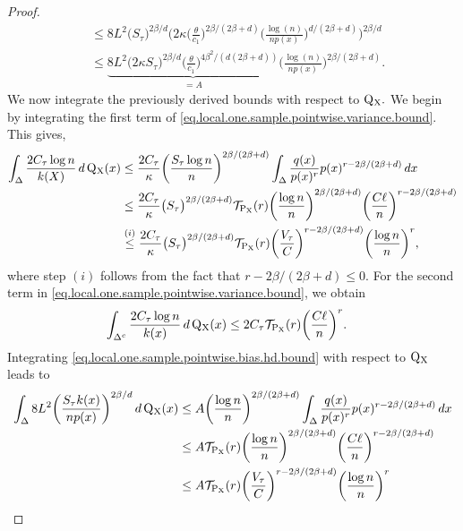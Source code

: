 \documentclass[10pt]{article}
\newcommand{\mT}{\mathcal{T}}
\renewcommand{\P}{\operatorname{P}}
\newcommand{\Q}{\operatorname{Q}}
\renewcommand{\k}{\kappa}
\newcommand{\sX}{\mathrm{X}}
\begin{document}
\begin{proof}
\begin{align}
        &\leq 8L^2\big(S_\tau\big)^{2\beta/d}\Bigg(2\k\bigg(\frac{\theta}{c_1}\bigg)^{2\beta/(2\beta + d)}\bigg(\frac{\log(n)}{np(x)}\bigg)^{d/(2\beta + d)}\Bigg)^{2\beta/d} \nonumber\\
        &\leq \underbrace{8L^2\big(2\k S_\tau\big)^{2\beta/d}\bigg(\frac{\theta}{c_1}\bigg)^{4\beta^2/(d(2\beta + d))}}_{= A}\bigg(\frac{\log(n)}{np(x)}\bigg)^{2\beta/(2\beta + d)}.
    \end{align}
    We now integrate the previously derived bounds with respect to $\Q\mathstrut_{\!\sX}.$ We begin by integrating the first term of \eqref{eq.local.one.sample.pointwise.variance.bound}. This gives,
    \begin{align*}
        \int_{\Delta}\frac{2C_\tau \log n}{k(X)}\, d\Q\mathstrut_{\!\sX}(x) &\leq \frac{2C_\tau}{\kappa}\bigg(\frac{S_\tau\log n}{n}\bigg)^{2\beta/(2\beta + d)}\int_{\Delta}\frac{q(x)}{p(x)^{r}}p(x)^{r - 2\beta/(2\beta + d)}\, dx\\
        &\leq \frac{2C_\tau}{\kappa}\big(S_\tau\big)^{2\beta/(2\beta + d)}\mT_{\P_{\sX}}(r)\bigg(\frac{\log n}{n}\bigg)^{2\beta/(2\beta + d)}\bigg(\frac{C\ell}{n}\bigg)^{r - 2\beta/(2\beta + d)}\\
        &\overset{(i)}{\leq} \frac{2C_\tau}{\kappa}\big(S_\tau\big)^{2\beta/(2\beta + d)}\mT_{\P_{\sX}}(r)\bigg(\frac{V_\tau}{C}\bigg)^{r - 2\beta/(2\beta + d)}\bigg(\frac{\log n}{n}\bigg)^{r},
    \end{align*}
    where step $(i)$ follows from the fact that $r - 2\beta/(2\beta + d) \leq 0.$ For the second term in \eqref{eq.local.one.sample.pointwise.variance.bound}, we obtain
    \begin{align*}
        \int_{\Delta^c}\frac{2C_\tau\log n}{k(x)}\, d\Q\mathstrut_{\!\sX}(x) &\leq 2C_\tau\mT_{\P_{\sX}}(r)\bigg(\frac{C\ell}{n}\bigg)^r.
    \end{align*}
    Integrating \eqref{eq.local.one.sample.pointwise.bias.hd.bound} with respect to $\Q\mathstrut_{\!\sX}$ leads to 
    \begin{align*}
        \int_{\Delta}8L^2\bigg(\frac{S_\tau k(x)}{np(x)}\bigg)^{2\beta/d}\, d\Q\mathstrut_{\!\sX}(x) &\leq A\bigg(\frac{\log n}n\bigg)^{2\beta/(2\beta + d)}\int_{\Delta}\frac{q(x)}{p(x)^{r}}p(x)^{r - 2\beta/(2\beta + d)}\, dx\\
        &\leq A\mT_{\P_{\sX}}(r)\bigg(\frac{\log n}n\bigg)^{2\beta/(2\beta + d)}\bigg(\frac{C\ell}n\bigg)^{r - 2\beta/(2\beta + d)}\\
        &\leq A\mT_{\P_{\sX}}(r)\bigg(\frac{V_\tau}{C}\bigg)^{r - 2\beta/(2\beta + d)}\bigg(\frac{\log n}n\bigg)^{r}

\end{align*}
\end{proof}
\end{document}
